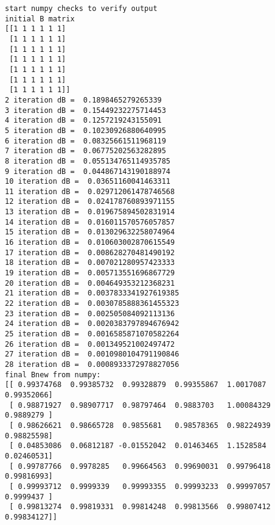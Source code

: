 \documentclass[11pt,a4paper]{article}
\begin{document}
\begin{verbatim}
start numpy checks to verify output
initial B matrix
[[1 1 1 1 1 1]
 [1 1 1 1 1 1]
 [1 1 1 1 1 1]
 [1 1 1 1 1 1]
 [1 1 1 1 1 1]
 [1 1 1 1 1 1]
 [1 1 1 1 1 1]]
2 iteration dB =  0.1898465279265339
3 iteration dB =  0.15449232275714453
4 iteration dB =  0.1257219243155091
5 iteration dB =  0.10230926880640995
6 iteration dB =  0.08325661511968119
7 iteration dB =  0.06775202563282895
8 iteration dB =  0.055134765114935785
9 iteration dB =  0.044867143190188974
10 iteration dB =  0.03651160041463311
11 iteration dB =  0.029712061478746568
12 iteration dB =  0.024178760893971155
13 iteration dB =  0.019675894502831914
14 iteration dB =  0.016011570576057857
15 iteration dB =  0.013029632258074964
16 iteration dB =  0.010603002870615549
17 iteration dB =  0.008628270481490192
18 iteration dB =  0.007021280957423333
19 iteration dB =  0.005713551696867729
20 iteration dB =  0.004649353212368231
21 iteration dB =  0.0037833341927619385
22 iteration dB =  0.0030785888361455323
23 iteration dB =  0.002505084092113136
24 iteration dB =  0.0020383797894676942
25 iteration dB =  0.0016585871070582264
26 iteration dB =  0.001349521002497472
27 iteration dB =  0.0010980104791190846
28 iteration dB =  0.0008933372978827056
final Bnew from numpy:
[[ 0.99374768  0.99385732  0.99328879  0.99355867  1.0017087   0.99352066]
 [ 0.98871927  0.98907717  0.98797464  0.9883703   1.00084329  0.9889279 ]
 [ 0.98626621  0.98665728  0.9855681   0.98578365  0.98224939  0.98825598]
 [ 0.04853086  0.06812187 -0.01552042  0.01463465  1.1528584   0.02460531]
 [ 0.99787766  0.9978285   0.99664563  0.99690031  0.99796418  0.99816993]
 [ 0.99993712  0.9999339   0.99993355  0.99993233  0.99997057  0.9999437 ]
 [ 0.99813274  0.99819331  0.99814248  0.99813566  0.99807412  0.99834127]]
\end{verbatim}
 
 
 \normalsize
 
\end{document}
